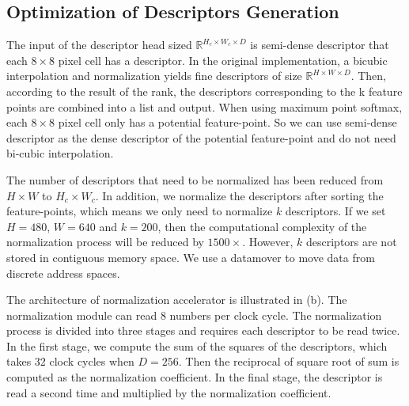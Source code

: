 



\subsection{Optimization of Descriptors Generation}

The input of the descriptor head sized $\mathbb{R}^{H_c\times W_c\times D}$ is semi-dense descriptor that each $8\times8$ pixel cell has a descriptor. In the original implementation, a bicubic interpolation and normalization yields fine descriptors of size $\mathbb{R}^{H\times W\times D}$. Then, according to the result of the rank, the descriptors corresponding to the k feature points are combined into a list and output. When using maximum point softmax, each $8\times8$ pixel cell only has a potential feature-point. So we can use semi-dense descriptor as the dense descriptor of the potential feature-point and do not need bi-cubic interpolation.

The number of descriptors that need to be normalized has been reduced from $H\times W$ to $H_c\times W_c$. In addition, we normalize the descriptors after sorting the feature-points, which means we only need to normalize $k$ descriptors. If we set $H=480$, $W=640$ and $k=200$, then the computational complexity of the normalization process will be reduced by $1500\times$. However, $k$ descriptors are not stored in contiguous memory space. We use a datamover to move data from discrete address spaces.

The architecture of normalization accelerator is illustrated in (b). The normalization module can read 8 numbers per clock cycle. The normalization process is divided into three stages and requires each descriptor to be read twice. In the first stage, we compute the sum of the squares of the descriptors, which takes 32 clock cycles when $D=256$. Then the reciprocal of square root of sum is computed as the normalization coefficient. In the final stage, the descriptor is read a second time and multiplied by the normalization coefficient.

